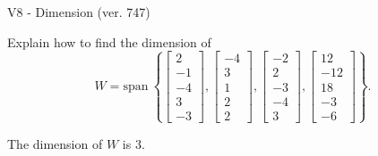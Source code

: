 \begin{exercise}
  \begin{exerciseTitle}V8 - Dimension (ver. 747)\end{exerciseTitle}
  \begin{exerciseStatement}
    Explain how to find the dimension of 
\[W=\mathrm{span}\ \left\{\left[\begin{array}{r}
2 \\
-1 \\
-4 \\
3 \\
-3
\end{array}\right] , \left[\begin{array}{r}
-4 \\
3 \\
1 \\
2 \\
2
\end{array}\right] , \left[\begin{array}{r}
-2 \\
2 \\
-3 \\
-4 \\
3
\end{array}\right] , \left[\begin{array}{r}
12 \\
-12 \\
18 \\
-3 \\
-6
\end{array}\right]\right\}.\]



  \end{exerciseStatement}
  \begin{exerciseAnswer}
   The dimension of \(W\) is  \(3\).
  


  \end{exerciseAnswer}
\end{exercise}